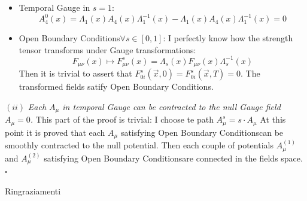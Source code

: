 \documentclass[english, LaM, oneside, noexaminfo]{sapthesis}
\newcommand{\obc}{Open Boundary Conditions}
\newcommand{\proved}{\newline \hspace*{.97\textwidth} $\square$}
\begin{document}
\begin{itemize}
    \item Temporal Gauge in $s=1$: $$A_4^0 (x) = \Lambda_1 (x) A_4 (x) \Lambda_1^{-1} (x) - \Lambda_1 (x) A_4 (x) \Lambda_1^{-1} (x) = 0$$
    \item \obc\space $\forall s \in [0,1]$: I perfectly know how the strength tensor transforms under Gauge transformations:
        $$F_{\mu\nu} (x) \mapsto F_{\mu\nu}^s (x) = \Lambda_s (x) F_{\mu\nu} (x) \Lambda_s^{-1} (x) $$
        Then it is trivial to assert that $F_{0i}^s (\vec x, 0) = F_{0i}^s (\vec x, T) = 0$.
        The transformed fields satify \obc.
\end{itemize}
$(ii)$ \textit{Each $A_\mu$ in temporal Gauge can be contracted to the null Gauge field $A_\mu = 0$.}
\newline
This part of the proof is trivial: I choose te path $A_\mu^s = s\cdot A_\mu$
\newline\newline
At this point it is proved that each $A_\mu$ satisfying \obc\space can be smoothly contracted to the null potential.
Then each couple of potentials $A_\mu^{(1)}$ and $A_\mu^{(2)}$ satisfying \obc\space are connected in the fields space.
\proved


\backmatter
{}
\printbibliography

\begin{acknowledgments}
    Ringraziamenti
\end{acknowledgments}
\end{document}
